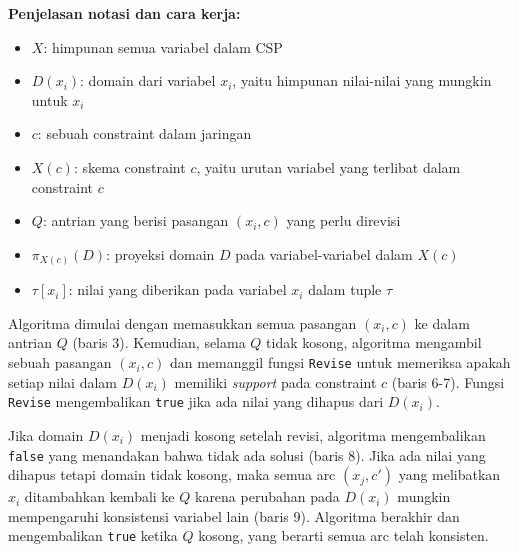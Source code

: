 \documentclass[a4paper,twoside]{article}
\begin{document}
	\textbf{Penjelasan notasi dan cara kerja:}
	\begin{itemize}
	\item $X$: himpunan semua variabel dalam CSP
	\item $D(x_i)$: domain dari variabel $x_i$, yaitu himpunan nilai-nilai yang mungkin untuk $x_i$
	\item $c$: sebuah constraint dalam jaringan
	\item $X(c)$: skema constraint $c$, yaitu urutan variabel yang terlibat dalam constraint $c$
	\item $Q$: antrian yang berisi pasangan $(x_i, c)$ yang perlu direvisi
	\item $\pi_{X(c)}(D)$: proyeksi domain $D$ pada variabel-variabel dalam $X(c)$
	\item $\tau[x_i]$: nilai yang diberikan pada variabel $x_i$ dalam tuple $\tau$
	\end{itemize}
	
	Algoritma dimulai dengan memasukkan semua pasangan $(x_i, c)$ ke dalam antrian $Q$ (baris 3). Kemudian, selama $Q$ tidak kosong, algoritma mengambil sebuah pasangan $(x_i, c)$ dan memanggil fungsi \texttt{Revise} untuk memeriksa apakah setiap nilai dalam $D(x_i)$ memiliki \textit{support} pada constraint $c$ (baris 6-7). Fungsi \texttt{Revise} mengembalikan \texttt{true} jika ada nilai yang dihapus dari $D(x_i)$.
	
	Jika domain $D(x_i)$ menjadi kosong setelah revisi, algoritma mengembalikan \texttt{false} yang menandakan bahwa tidak ada solusi (baris 8). Jika ada nilai yang dihapus tetapi domain tidak kosong, maka semua arc $(x_j, c')$ yang melibatkan $x_i$ ditambahkan kembali ke $Q$ karena perubahan pada $D(x_i)$ mungkin mempengaruhi konsistensi variabel lain (baris 9). Algoritma berakhir dan mengembalikan \texttt{true} ketika $Q$ kosong, yang berarti semua arc telah konsisten.
	
\end{document}
